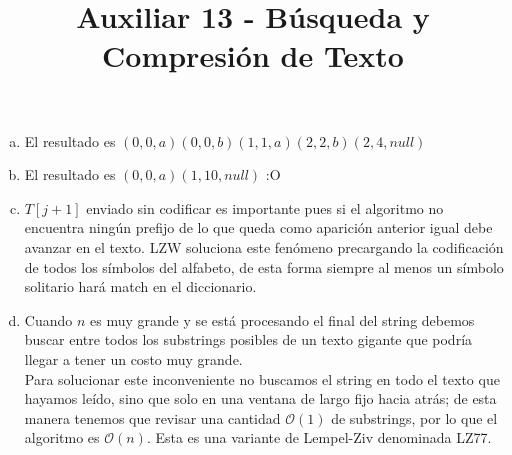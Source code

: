 \documentclass[dcc,sol]{fcfmcourse}
\title{Auxiliar 13 - Búsqueda y Compresión de Texto}
\begin{document}
    \maketitle
    
    \vspace{-1ex}
    
    
    \begin{problems}
    
    \problem
    
    \problem
    \begin{enumerate}[a)]
        \item El resultado es $(0,0,a)(0,0,b)(1,1,a)(2,2,b)(2,4,null)$
        \item El resultado es $(0,0,a)(1,10,null)$ :O
        \item $T[j+1]$ enviado sin codificar es importante pues si el algoritmo no encuentra ningún prefijo de lo que queda como aparición anterior igual debe avanzar en el texto. LZW soluciona este fenómeno precargando la codificación de todos los símbolos del alfabeto, de esta forma siempre al menos un símbolo solitario hará match en el diccionario.
        \item Cuando $n$ es muy grande y se está procesando el final del string debemos buscar entre todos los substrings posibles de un texto gigante que podría llegar a tener un costo muy grande.\\
        Para solucionar este inconveniente no buscamos el string en todo el texto que hayamos leído, sino que solo en una ventana de largo fijo hacia atrás; de esta manera tenemos que revisar una cantidad $\mathcal{O}(1)$ de substrings, por lo que el algoritmo es $\mathcal{O}(n)$. Esta es una variante de Lempel-Ziv denominada LZ77.
    \end{enumerate}
    \end{problems}
    
\end{document}
